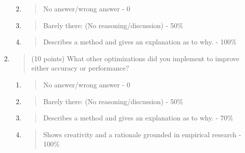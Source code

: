 \documentclass[
]{article}
\begin{document}
\begin{enumerate}
  \begin{enumerate}
  \def\labelenumii{\alph{enumii}.}
  \item
    \begin{quote}
    No answer/wrong answer - 0
    \end{quote}
  \item
    \begin{quote}
    Barely there: (No reasoning/discussion) - 50\%
    \end{quote}
  \item
    \begin{quote}
    Describes a method and gives an explanation as to why. - 100\%
    \end{quote}
  \end{enumerate}
\item
  \begin{quote}
  (10 points) What other optimizations did you implement to improve
  either accuracy or performance?
  \end{quote}

  \begin{enumerate}
  \def\labelenumii{\alph{enumii}.}
  \item
    \begin{quote}
    No answer/wrong answer - 0
    \end{quote}
  \item
    \begin{quote}
    Barely there: (No reasoning/discussion) - 50\%
    \end{quote}
  \item
    \begin{quote}
    Describes a method and gives an explanation as to why. - 70\%
    \end{quote}
  \item
    \begin{quote}
    Shows creativity and a rationale grounded in empirical research -
    100\%
    \end{quote}
  \end{enumerate}
\end{enumerate}
\end{document}
